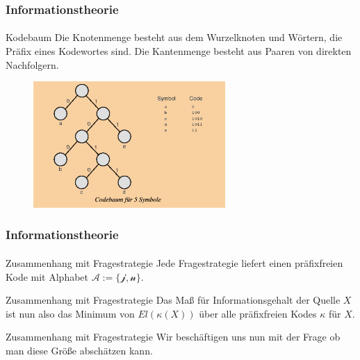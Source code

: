 \documentclass{beamer}
\begin{document}
\begin{frame}
    \frametitle{Informationstheorie}
\framesubtitle{}

\begin{block}{Kodebaum}
Die Knotenmenge besteht aus dem Wurzelknoten und Wörtern, die Präfix eines Kodewortes sind. Die Kantenmenge besteht aus Paaren von direkten Nachfolgern.
\end{block}
\begin{figure}[htp]
      \centering
    \includegraphics[width=0.65\textwidth]{img/Kodebaum}
\end{figure}
 \end{frame}



\begin{frame}
    \frametitle{Informationstheorie}
\framesubtitle{}

\begin{block}{Zusammenhang mit Fragestrategie}
Jede Fragestrategie liefert einen präfixfreien Kode mit Alphabet $\mathcal{A := \{  \text{j} ,\text{n} \}}$.
\end{block}

\begin{block}{Zusammenhang mit Fragestrategie}
Das Maß für Informationsgehalt der Quelle $X$ ist nun also das Minimum von $El(\kappa (X))$ über alle präfixfreien Kodes $\kappa$ für $X$.
\end{block}

\begin{block}{Zusammenhang mit Fragestrategie}
Wir beschäftigen uns nun mit der Frage ob  man diese Größe abschätzen kann.
\end{block}


 \end{frame}
\end{document}
